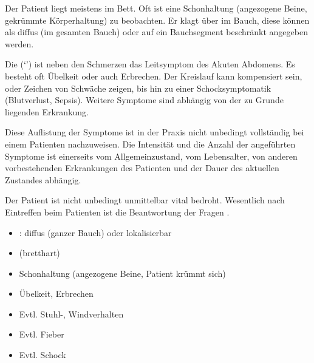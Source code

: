 {%
Der Patient liegt meistens im Bett. Oft ist eine
Schonhaltung (angezogene Beine, gekrümmte Körperhaltung) zu
beobachten. Er klagt über  im Bauch, diese können
als diffus (im gesamten Bauch) oder auf ein Bauchsegment
beschränkt angegeben werden.

Die  (\enquote*{}) ist
neben den Schmerzen das Leitsymptom des Akuten Abdomens.
Es besteht oft Übelkeit oder auch Erbrechen. Der Kreislauf
kann kompensiert sein, oder Zeichen von Schwäche zeigen, bis
hin zu einer Schocksymptomatik (Blutverlust, Sepsis).
Weitere Symptome sind abhängig von der zu Grunde liegenden
Erkrankung.

Diese Auflistung der Symptome ist in der Praxis nicht
unbedingt vollständig bei einem Patienten nachzuweisen. Die
Intensität und die Anzahl der angeführten Symptome ist
einerseits vom Allgemeinzustand, vom Lebensalter, von
anderen vorbestehenden Erkrankungen des Patienten und der
Dauer des aktuellen Zustandes abhängig.

Der Patient ist nicht unbedingt unmittelbar vital
bedroht. Wesentlich nach Eintreffen beim Patienten ist die
Beantwortung der Fragen .

} 
{
\begin{itemize}
  \item {}: diffus (ganzer Bauch) oder
  lokalisierbar
  \item {} (bretthart)
  \item Schonhaltung  (angezogene Beine, Patient
  krümmt sich)
  \item Übelkeit, Erbrechen
  \item Evtl. Stuhl-, Windverhalten
  \item Evtl. Fieber
  \item Evtl. Schock
\end{itemize}
}{}{}{}




